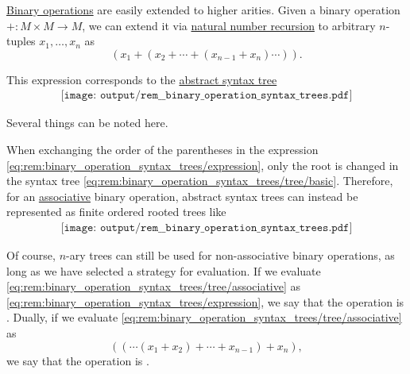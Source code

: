\begin{remark}\label{rem:binary_operation_syntax_trees}
  \hyperref[def:magma]{Binary operations} are easily extended to higher arities. Given a binary operation \( +: M \times M \to M \), we can extend it via \hyperref[rem:natural_number_recursion]{natural number recursion} to arbitrary \( n \)-tuples \( x_1, \ldots, x_n \) as
  \begin{equation}\label{eq:rem:binary_operation_syntax_trees/expression}
    (x_1 + (x_2 + \cdots + (x_{n-1} + x_n) \cdots )).
  \end{equation}

  This expression corresponds to the \hyperref[rem:abstract_syntax_tree]{abstract syntax tree}
  \begin{equation}\label{eq:rem:binary_operation_syntax_trees/tree/basic}
    \begin{aligned}
      \texttt{[image: output/rem\_\_binary\_operation\_syntax\_trees.pdf]}
    \end{aligned}
  \end{equation}

  Several things can be noted here.
  \begin{thmenum}
     When exchanging the order of the parentheses in the expression \eqref{eq:rem:binary_operation_syntax_trees/expression}, only the root is changed in the syntax tree \eqref{eq:rem:binary_operation_syntax_trees/tree/basic}. Therefore, for an \hyperref[def:magma/associative]{associative} binary operation, abstract syntax trees can instead be represented as finite ordered rooted trees like
    \begin{equation}\label{eq:rem:binary_operation_syntax_trees/tree/associative}
      \begin{aligned}
        \texttt{[image: output/rem\_\_binary\_operation\_syntax\_trees.pdf]}
      \end{aligned}
    \end{equation}

    Of course, \( n \)-ary trees can still be used for non-associative binary operations, as long as we have selected a strategy for evaluation. If we evaluate \eqref{eq:rem:binary_operation_syntax_trees/tree/associative} as \eqref{eq:rem:binary_operation_syntax_trees/expression}, we say that the operation is . Dually, if we evaluate \eqref{eq:rem:binary_operation_syntax_trees/tree/associative} as
    \begin{equation*}
      (( \cdots (x_1 + x_2) + \cdots + x_{n-1}) + x_n),
    \end{equation*}
    we say that the operation is .


\end{thmenum}
\end{remark}
